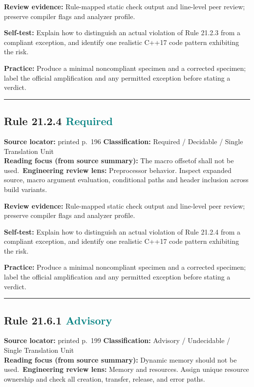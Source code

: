 \documentclass[10pt,letterpaper]{article}
\begin{document}
\textbf{Review evidence:} Rule-mapped static check output and line-level peer review; preserve compiler flags and analyzer profile.

\textbf{Self-test:} Explain how to distinguish an actual violation of Rule 21.2.3 from a compliant exception, and identify one realistic C++17 code pattern exhibiting the risk.\par
\textbf{Practice:} Produce a minimal noncompliant specimen and a corrected specimen; label the official amplification and any permitted exception before stating a verdict.
\smallskip\hrule\smallskip
\subsection*{Rule 21.2.4 \enspace \texorpdfstring{\small\textcolor{teal}{Required}}{Required}}
\noindent\textbf{Source locator:} printed p.~196 \quad\textbf{Classification:} Required / Decidable / Single Translation Unit\\
\textbf{Reading focus (from source summary):} The macro offsetof shall not be used.\
\textbf{Engineering review lens:} Preprocessor behavior. Inspect expanded source, macro argument evaluation, conditional paths and header inclusion across build variants.

\textbf{Review evidence:} Rule-mapped static check output and line-level peer review; preserve compiler flags and analyzer profile.

\textbf{Self-test:} Explain how to distinguish an actual violation of Rule 21.2.4 from a compliant exception, and identify one realistic C++17 code pattern exhibiting the risk.\par
\textbf{Practice:} Produce a minimal noncompliant specimen and a corrected specimen; label the official amplification and any permitted exception before stating a verdict.
\smallskip\hrule\smallskip
\subsection*{Rule 21.6.1 \enspace \texorpdfstring{\small\textcolor{teal}{Advisory}}{Advisory}}
\noindent\textbf{Source locator:} printed p.~199 \quad\textbf{Classification:} Advisory / Undecidable / Single Translation Unit\\
\textbf{Reading focus (from source summary):} Dynamic memory should not be used.\
\textbf{Engineering review lens:} Memory and resources. Assign unique resource ownership and check all creation, transfer, release, and error paths.
\end{document}
